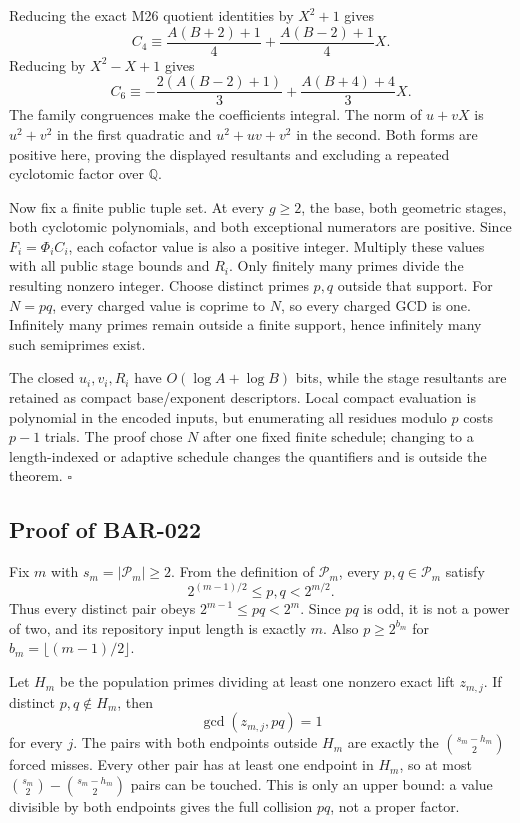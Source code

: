 \documentclass[11pt]{article}
\begin{document}
Reducing the exact M26 quotient identities by \(X^2+1\) gives
\[
C_4\equiv
\frac{A(B+2)+1}{4}+
\frac{A(B-2)+1}{4}X.
\]
Reducing by \(X^2-X+1\) gives
\[
C_6\equiv
-\frac{2(A(B-2)+1)}{3}+
\frac{A(B+4)+4}{3}X.
\]
The family congruences make the coefficients integral. The norm of \(u+vX\)
is \(u^2+v^2\) in the first quadratic and \(u^2+uv+v^2\) in the second.
Both forms are positive here, proving the displayed resultants and excluding
a repeated cyclotomic factor over \(\mathbb Q\).

Now fix a finite public tuple set. At every \(g\ge2\), the base, both
geometric stages, both cyclotomic polynomials, and both exceptional
numerators are positive. Since \(F_i=\Phi_iC_i\), each cofactor value is also
a positive integer. Multiply these values with all public stage bounds and
\(R_i\). Only finitely many primes divide the resulting nonzero integer.
Choose distinct primes \(p,q\) outside that support. For \(N=pq\), every
charged value is coprime to \(N\), so every charged GCD is one. Infinitely
many primes remain outside a finite support, hence infinitely many such
semiprimes exist.

The closed \(u_i,v_i,R_i\) have \(O(\log A+\log B)\) bits, while the stage
resultants are retained as compact base/exponent descriptors. Local compact
evaluation is polynomial in the encoded inputs, but enumerating all residues
modulo \(p\) costs \(p-1\) trials. The proof chose \(N\) after one fixed
finite schedule; changing to a length-indexed or adaptive schedule changes
the quantifiers and is outside the theorem. \(\square\)

\subsection{Proof of BAR-022}\label{proof:BAR-022}

Fix \(m\) with \(s_m=|\mathcal P_m|\ge2\). From the definition of
\(\mathcal P_m\), every \(p,q\in\mathcal P_m\) satisfy
\[
 2^{(m-1)/2}\le p,q<2^{m/2}.
\]
Thus every distinct pair obeys \(2^{m-1}\le pq<2^m\). Since \(pq\) is odd,
it is not a power of two, and its repository input length is exactly \(m\).
Also \(p\ge2^{b_m}\) for
\(b_m=\lfloor(m-1)/2\rfloor\).

Let \(H_m\) be the population primes dividing at least one nonzero exact lift
\(z_{m,j}\). If distinct \(p,q\notin H_m\), then
\[
 \gcd(z_{m,j},pq)=1
\]
for every \(j\). The pairs with both endpoints outside \(H_m\) are exactly
the \(\binom{s_m-h_m}{2}\) forced misses. Every other pair has at least one
endpoint in \(H_m\), so at most
\(\binom{s_m}{2}-\binom{s_m-h_m}{2}\) pairs can be touched. This is only an
upper bound: a value divisible by both endpoints gives the full collision
\(pq\), not a proper factor.
\end{document}
